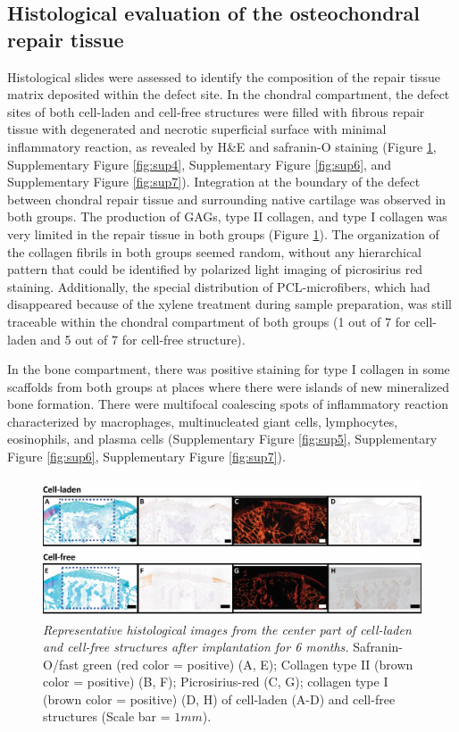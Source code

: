 \documentclass[twocolumn, serif, empirical, authordate, seplic]{jote-article}
\begin{document}
 {}\subsection*{Histological evaluation of the osteochondral repair tissue} 

Histological slides were assessed to identify the composition of the repair tissue matrix deposited within the defect site. In the chondral compartment, the defect sites of both cell-laden and cell-free structures were filled with fibrous repair tissue with degenerated and necrotic superficial surface with minimal inflammatory reaction, as revealed by H\&E and safranin-O staining (Figure \ref{fig:figure11}, Supplementary Figure \ref{fig:sup4}, Supplementary Figure \ref{fig:sup6}, and Supplementary Figure \ref{fig:sup7}). Integration at the boundary of the defect between chondral repair tissue and surrounding native cartilage was observed in both groups. The production of GAGs, type II collagen, and type I collagen was very limited in the repair tissue in both groups (Figure \ref{fig:figure11}). The organization of the collagen fibrils in both groups seemed random, without any hierarchical pattern that could be identified by polarized light imaging of picrosirius red staining. Additionally, the special distribution of PCL-microfibers, which had disappeared because of the xylene treatment during sample preparation, was still traceable within the chondral compartment of both groups (1 out of 7 for cell-laden and 5 out of 7 for cell-free structure).

In the bone compartment, there was positive staining for type I collagen in some scaffolds from both groups at places where there were islands of new mineralized bone formation. There were multifocal coalescing spots of inflammatory reaction characterized by macrophages, multinucleated giant cells, lymphocytes, eosinophils, and plasma cells (Supplementary Figure \ref{fig:sup5}, Supplementary Figure \ref{fig:sup6}, Supplementary Figure \ref{fig:sup7}).

\begin{figure}[b]
\centering \includegraphics[width=\textwidth]{articles/empirical/horse/media/image11.jpg}
\caption{\emph{Representative histological images from the center part of cell-laden and cell-free structures after implantation for 6 months.} Safranin-O/fast green (red color = positive) (A, E); Collagen type II (brown color = positive) (B, F); Picrosirius-red (C, G); collagen type I (brown color = positive) (D, H) of cell-laden (A-D) and cell-free structures (Scale bar = $1mm$).}
\label{fig:figure11}\end{figure}
\end{document}

